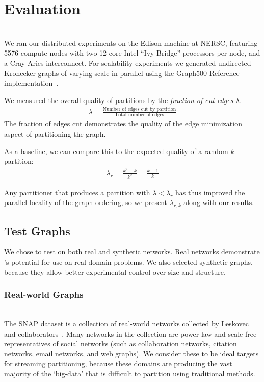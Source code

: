 \section{Evaluation}
\\

We ran our distributed experiments on the Edison machine at NERSC, featuring 5576 compute nodes with two 12-core Intel ``Ivy Bridge'' processors per node, and a Cray Aries interconnect. For scalability experiments we generated undirected Kronecker graphs of varying scale in parallel using the Graph500 Reference implementation~\cite{graph500}. 


We measured the overall quality of partitions by the \textit{fraction of cut edges} $\lambda$.
\begin{align}\lambda = \frac{\text{Number of edges cut by partition}}{\text{Total number of edges}}\end{align}
The fraction of edges cut demonstrates the quality of the edge minimization aspect of partitioning the graph.

As a baseline, we can compare this to the expected quality of a random $k-$partition:
\begin{align}\lambda_r = \frac{k^2 - k}{k^2} = \frac{k-1}{k} \end{align}

Any partitioner that produces a partition with $\lambda < \lambda_r$ has thus improved the parallel locality of the graph ordering, so we present $\lambda_{r,k}$ along with our results.

\subsection{Test Graphs}
We chose to test on both real and synthetic networks.
Real networks demonstrate \ourmethod's potential for use on real domain problems.
We also selected synthetic graphs, because they allow better experimental control over size and structure.
\subsubsection{Real-world Graphs}
\\
The SNAP dataset is a collection of real-world networks collected by Leskovec and collaborators~\cite{Leskovec-data, snapnets}. 
Many networks in the collection are power-law and scale-free representatives of social networks (such as collaboration networks, citation networks, email networks, and web graphs). We consider these to be ideal targets for streaming partitioning, because these domains are producing the vast majority of the `big-data' that is difficult to partition using traditional methods.


